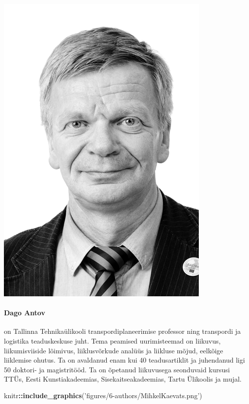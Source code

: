 \documentclass[estonian,]{article}
\newenvironment{Shaded}{\begin{snugshade}}{\end{snugshade}}
\newcommand{\KeywordTok}[1]{\textcolor[rgb]{0.13,0.29,0.53}{\textbf{#1}}}
\newcommand{\NormalTok}[1]{#1}
\newcommand{\OperatorTok}[1]{\textcolor[rgb]{0.81,0.36,0.00}{\textbf{#1}}}
\newcommand{\StringTok}[1]{\textcolor[rgb]{0.31,0.60,0.02}{#1}}
\let\oldparagraph\paragraph
\renewcommand{\paragraph}[1]{\oldparagraph{#1}\mbox{}}
\begin{document}
\begin{flushleft}\includegraphics[width=0.5\linewidth]{figures/6-authors/DagoAntov} \end{flushleft}

\hypertarget{dago-antov}{%
\paragraph{Dago Antov}\label{dago-antov}}

on Tallinna Tehnikaülikooli transpordiplaneerimise professor ning transpordi ja logistika teaduskeskuse juht. Tema peamised uurimisteemad on liikuvus, liikumisviiside lõimivus, liiklusvõrkude analüüs ja liikluse mõjud, eelkõige liiklemise ohutus. Ta on avaldanud enam kui 40 teadusartiklit ja juhendanud ligi 50 doktori- ja magistritööd. Ta on õpetanud liikuvusega seonduvaid kursusi TTÜs, Eesti Kunstiakadeemias, Sisekaitseakadeemias, Tartu Ülikoolis ja mujal.

\begin{Shaded}
\begin{Highlighting}[]
\NormalTok{knitr}\OperatorTok{::}\KeywordTok{include_graphics}\NormalTok{(}\StringTok{'figures/6-authors/MihkelKaevats.png'}\NormalTok{)}
\end{Highlighting}
\end{Shaded}
\end{document}
